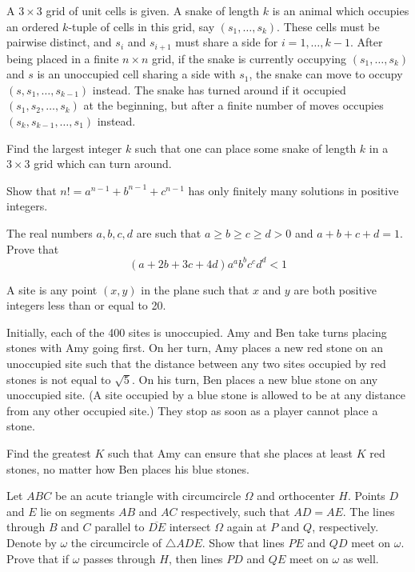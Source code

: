 \documentclass[11pt]{scrartcl}
\begin{document}
\begin{problem}[965885167255885]
A $3 \times 3$ grid of unit cells is given. A snake of length $k$ is an animal which occupies an ordered $k$-tuple of cells in this grid, say $(s_1, \dots, s_k)$. These cells must be pairwise distinct, and $s_i$ and $s_{i+1}$ must share a side for $i = 1, \dots, k-1$. After being placed in a finite $n \times n$ grid, if the snake is currently occupying $(s_1, \dots, s_k)$ and $s$ is an unoccupied cell sharing a side with $s_1$, the snake can move to occupy $(s, s_1, \dots, s_{k-1})$ instead. The snake has turned around if it occupied $(s_1, s_2, \dots, s_k)$ at the beginning, but after a finite number of moves occupies $(s_k, s_{k-1}, \dots, s_1)$ instead.

Find the largest integer $k$ such that one can place some snake of length $k$ in a $3 \times 3$ grid which can turn around.
\end{problem}
\begin{problem}[599825051147866097]
Show that $n!=a^{n-1}+b^{n-1}+c^{n-1}$ has only finitely many solutions in positive integers.
\end{problem}
\begin{problem}[3813623497653179264]
	The real numbers $a, b, c, d$ are such that $a\geq b\geq c\geq d>0$ and $a+b+c+d=1$. Prove that
\[(a+2b+3c+4d)a^ab^bc^cd^d<1\]
\end{problem}
\begin{problem}[6246999615324043054]
	A site is any point $(x, y)$ in the plane such that $x$ and $y$ are both positive integers less than or equal to 20.

Initially, each of the 400 sites is unoccupied. Amy and Ben take turns placing stones with Amy going first. On her turn, Amy places a new red stone on an unoccupied site such that the distance between any two sites occupied by red stones is not equal to $\sqrt{5}$. On his turn, Ben places a new blue stone on any unoccupied site. (A site occupied by a blue stone is allowed to be at any distance from any other occupied site.) They stop as soon as a player cannot place a stone.

Find the greatest $K$ such that Amy can ensure that she places at least $K$ red stones, no matter how Ben places his blue stones.
\end{problem}
\begin{problem}[63514716280156]
Let $ABC$ be an acute triangle with circumcircle $\Omega$ and orthocenter $H$. Points $D$ and $E$ lie on segments $AB$ and $AC$ respectively, such that $AD = AE$. The lines through $B$ and $C$ parallel to $\overline{DE}$ intersect $\Omega$ again at $P$ and $Q$, respectively. Denote by $\omega$ the circumcircle of $\triangle ADE$.
Show that lines $PE$ and $QD$ meet on $\omega$.
Prove that if $\omega$ passes through $H$, then lines $PD$ and $QE$ meet on $\omega$ as well.
\end{problem}
\end{document}
